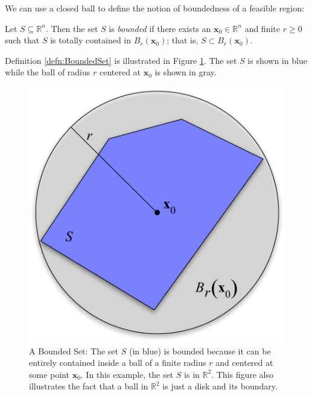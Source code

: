 We can use a closed ball to define the notion of boundedness of a feasible region: 
\begin{definition}{}{} Let $S \subseteq \mathbb{R}^n$. Then the set $S$ is \textit{bounded} if there exists an $\mathbf{x}_0 \in \mathbb{R}^n$ and finite $r \geq 0$ such that $S$ is totally contained in $B_r(\mathbf{x}_0)$; that is, $S \subset B_r(\mathbf{x}_0)$.
\label{defn:BoundedSet}
\end{definition}
Definition \ref{defn:BoundedSet} is illustrated in Figure \ref{fig:BoundedSet}. The set $S$ is shown in blue while the ball of radius $r$ centered at $\mathbf{x}_0$ is shown in gray. 
\begin{figure}[H]
\centering
\includegraphics[scale=0.4]{BallBounded.pdf}
\caption{A Bounded Set: The set $S$ (in blue) is bounded because it can be entirely contained inside a ball of a finite radius $r$ and centered at some point $\mathbf{x}_0$. In this example, the set $S$ is in $\mathbb{R}^2$. This figure also illustrates the fact that a ball in $\mathbb{R}^2$ is just a disk and its boundary.}
\label{fig:BoundedSet}
\end{figure}

